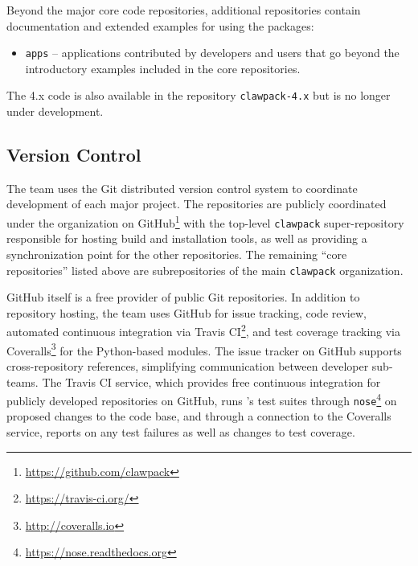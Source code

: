 Beyond the major core code repositories, additional repositories contain
documentation and extended examples for using the packages:
\begin{itemize}
    \item \texttt{apps} -- applications contributed by developers and
    users that go beyond the introductory examples included in the core
    repositories.
\end{itemize}
The \clawpack 4.x code is also available in the repository \texttt{clawpack-4.x}
but is no longer under development.


\subsection{Version Control}

The \clawpack team uses the Git distributed version control system
to coordinate development of each major project.  The repositories are
publicly coordinated under the \clawpack organization on
GitHub\footnote{\url{https://github.com/clawpack}} with the
top-level \texttt{clawpack} super-repository responsible for hosting
build and installation tools, as well as providing a synchronization
point for the other repositories.  The remaining ``core \clawpack repositories''
listed above are subrepositories of the main \texttt{clawpack} organization.

GitHub itself is a free provider of public Git repositories.  In addition to
repository hosting, the \clawpack team uses GitHub for issue tracking,
code review, automated continuous integration via Travis CI\footnote{\url{https://travis-ci.org/}},
and test coverage tracking via Coveralls\footnote{\url{http://coveralls.io}}
for the Python-based modules.  The issue tracker on
GitHub supports cross-repository references,
simplifying communication between \clawpack developer sub-teams.  The
Travis CI service, which provides free continuous integration for
publicly developed repositories on GitHub, runs \clawpack's test
suites through \texttt{nose}\footnote{\url{https://nose.readthedocs.org}}
on proposed changes
to the code base, and through a connection to the Coveralls service,
reports on any test failures as well as changes to test coverage.

